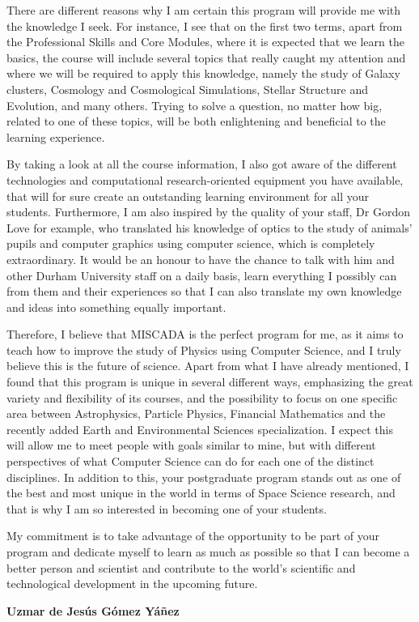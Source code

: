 \documentclass{article}
\begin{document}
\vspace{.5cm}

There are different reasons why I am certain this program will provide me with the knowledge I seek. For instance, I see that on the first two terms, apart from the Professional Skills and Core Modules, where it is expected that we learn the basics, the course will include several topics that really caught my attention and where we will be required to apply this knowledge, namely the study of Galaxy clusters, Cosmology and Cosmological Simulations, Stellar Structure and Evolution, and many others. Trying to solve a question, no matter how big, related to one of these topics, will be both enlightening and beneficial to the learning experience. 

\vspace{.5cm}

By taking a look at all the course information, I also got aware of the different technologies and computational research-oriented equipment you have available, that will for sure create an outstanding learning environment for all your students. Furthermore, I am also inspired by the quality of your staff, Dr Gordon Love for example, who translated his knowledge of optics to the study of animals' pupils and computer graphics using computer science, which is completely extraordinary. It would be an honour to have the chance to talk with him and other Durham University staff on a daily basis, learn everything I possibly can from them and their experiences so that I can also translate my own knowledge and ideas into something equally important.

\vspace{.5cm}

Therefore, I believe that MISCADA is the perfect program for me, as it aims to teach how to improve the study of Physics using Computer Science, and I truly believe this is the future of science. Apart from what I have already mentioned, I found that this program is unique in several different ways, emphasizing the great variety and flexibility of its courses, and the possibility to focus on one specific area between Astrophysics, Particle Physics, Financial Mathematics and the recently added Earth and Environmental Sciences specialization. I expect this will allow me to meet people with goals similar to mine, but with different perspectives of what Computer Science can do for each one of the distinct disciplines. In addition to this, your postgraduate program stands out as one of the best and most unique in the world in terms of Space Science research, and that is why I am so interested in becoming one of your students.

\vspace{.5cm}

My commitment is to take advantage of the opportunity to be part of your program and dedicate myself to learn as much as possible so that I can become a better person and scientist and contribute to the world’s scientific and technological development in the upcoming future.

\vspace{2cm}
\hfill \textbf{Uzmar de Jesús Gómez Yáñez}
\end{document}
